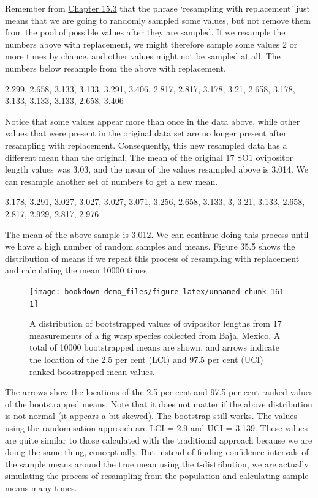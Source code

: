 \documentclass[
  openany]{krantz}
\begin{document}
Remember from \protect\hyperlink{sampling-with-and-without-replacement}{Chapter 15.3} that the phrase `resampling with replacement' just means that we are going to randomly sampled some values, but not remove them from the pool of possible values after they are sampled.
If we resample the numbers above with replacement, we might therefore sample some values 2 or more times by chance, and other values might not be sampled at all.
The numbers below resample from the above with replacement.

2.299, 2.658, 3.133, 3.133, 3.291, 3.406, 2.817, 2.817, 3.178, 3.21, 2.658, 3.178, 3.133, 3.133, 3.133, 2.658, 3.406

Notice that some values appear more than once in the data above, while other values that were present in the original data set are no longer present after resampling with replacement. Consequently, this new resampled data has a different mean than the original.
The mean of the original 17 SO1 ovipositor length values was 3.03, and the mean of the values resampled above is 3.014.
We can resample another set of numbers to get a new mean.

3.178, 3.291, 3.027, 3.027, 3.027, 3.071, 3.256, 2.658, 3.133, 3, 3.21, 3.133, 2.658, 2.817, 2.929, 2.817, 2.976

The mean of the above sample is 3.012.
We can continue doing this process until we have a high number of random samples and means. Figure 35.5 shows the distribution of means if we repeat this process of resampling with replacement and calculating the mean 10000 times.

\begin{figure}
\texttt{[image: bookdown-demo\_files/figure-latex/unnamed-chunk-161-1]} \caption{A distribution of bootstrapped values of ovipositor lengths from 17 measurements of a fig wasp species collected from Baja, Mexico. A total of 10000 bootstrapped means are shown, and arrows indicate the location of the 2.5 per cent (LCI) and 97.5 per cent (UCI) ranked boostrapped mean values.}\label{fig:unnamed-chunk-161}
\end{figure}

The arrows show the locations of the 2.5 per cent and 97.5 per cent ranked values of the bootstrapped means.
Note that it does not matter if the above distribution is not normal (it appears a bit skewed).
The bootstrap still works.
The values using the randomisation approach are LCI = 2.9 and UCI = 3.139.
These values are quite similar to those calculated with the traditional approach because we are doing the same thing, conceptually.
But instead of finding confidence intervals of the sample means around the true mean using the t-distribution, we are actually simulating the process of resampling from the population and calculating sample means many times.
\end{document}
